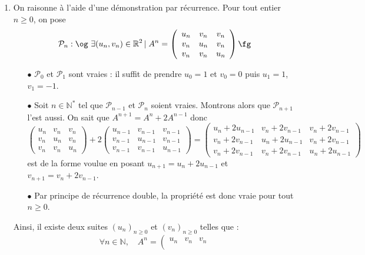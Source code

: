 \documentclass[a4paper,10pt]{report}
\begin{document}
\begin{enumerate}
\item On raisonne à l'aide d'une démonstration par récurrence. Pour tout entier $n \geq 0$, on pose $$ \mathcal{P}_n : \hbox{\og} \  \exists (u_n, v_n) \in \mathbb{R}^2 \, \vert \;  A^n  = \left( {\begin{array}{*{20}{c}}
{{u_n}}&{{v_n}}&{{v_n}}\\
{{v_n}}&{{u_n}}&{{v_n}}\\
{{v_n}}&{{v_n}}&{{u_n}}
\end{array}} \right) \hbox{\fg}$$
\begin{enumerate}
\item [$\bullet$] $\mathcal{P}_0$ et $\mathcal{P}_1$ sont vraies : il suffit de prendre $u_0=1$ et $v_0=0$ puis $u_1 = 1$, $v_1=-1$.
\item [$\bullet$] Soit $n \in \mathbb{N}^*$ tel que $\mathcal{P}_{n-1}$ et $\mathcal{P}_n$ soient vraies. Montrons alors que $\mathcal{P}_{n+1}$ l'est aussi. On sait que $A^{n+1} = A^n + 2 A^{n-1}$ donc \[\left( {\begin{array}{*{20}{c}}
{{u_n}}&{{v_n}}&{{v_n}}\\
{{v_n}}&{{u_n}}&{{v_n}}\\
{{v_n}}&{{v_n}}&{{u_n}}
\end{array}} \right) + 2\left( {\begin{array}{*{20}{c}}
{{u_{n - 1}}}&{{v_{n - 1}}}&{{v_{n - 1}}}\\
{{v_{n - 1}}}&{{u_{n - 1}}}&{{v_{n - 1}}}\\
{{v_{n - 1}}}&{{v_{n - 1}}}&{{u_{n - 1}}}
\end{array}} \right) = \left( {\begin{array}{*{20}{c}}
{{u_n} + 2{u_{n - 1}}}&{{v_n} + 2{v_{n - 1}}}&{{v_n} + 2{v_{n - 1}}}\\
{{v_n} + 2{v_{n - 1}}}&{{u_n} + 2{u_{n - 1}}}&{{v_n} + 2{v_{n - 1}}}\\
{{v_n} + 2{v_{n - 1}}}&{{v_n} + 2{v_{n - 1}}}&{{u_n} + 2{u_{n - 1}}}
\end{array}} \right)\]
est de la forme voulue en posant $u_{n+1} = u_n + 2 u_{n-1}$ et $v_{n+1}= v_n + 2 v_{n-1}$.
\item [$\bullet$] Par principe de récurrence double, la propriété est donc vraie pour tout $n \geq 0$.
\end{enumerate}
Ainsi, il existe deux suites $\left(u_{n}\right)_{n \geq 0}$
et $\left(v_{n}\right)_{n \geq 0}$ telles que :
\[
\forall n\in\mathbb{N},\quad A^{n}=\left(\begin{array}{ccc}
u_{n} & v_{n} & v_{n}\\

\end{array}\]
\end{enumerate}
\end{document}
